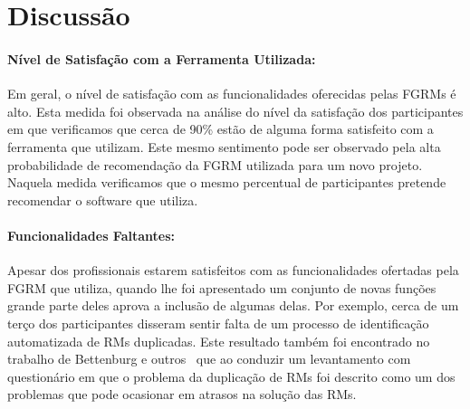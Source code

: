 \begin{table}[htpb]
\centering
{}
\caption{Classificação das funcionalidades que possam dar suporte ao uso das
metodologias dos agilistas.}
\label{tab:melhorias_fgrm_suporte_particas_ageis}
\end{table}

\section{Discussão}

\paragraph{Nível de Satisfação com a Ferramenta Utilizada:}
\label{par:pesq_profissionais_nivel_de_satisfação}

Em geral, o nível de satisfação com as funcionalidades oferecidas pelas FGRMs é
alto. Esta medida foi observada na análise do nível da satisfação dos
participantes em que verificamos que cerca de 90\% estão de alguma forma
satisfeito com a ferramenta que utilizam. Este mesmo sentimento pode ser
observado pela alta probabilidade de recomendação da FGRM utilizada para um novo
projeto. Naquela medida verificamos que o mesmo percentual de participantes
pretende recomendar o software que utiliza.

\paragraph{Funcionalidades Faltantes:}
\label{par:pesq_profissionais_funcionalidades_faltantes}

Apesar dos profissionais estarem satisfeitos com as funcionalidades ofertadas
pela FGRM que utiliza, quando lhe foi apresentado um conjunto de novas funções
grande parte deles aprova a inclusão de algumas delas. Por exemplo, cerca de um
terço dos participantes disseram sentir falta de um processo de identificação
automatizada de RMs duplicadas. Este resultado também foi encontrado no trabalho
de Bettenburg e outros~\cite{bettenburg2008makes} que ao conduzir um
levantamento com questionário em que o problema da duplicação de RMs foi descrito
como um dos problemas que pode ocasionar em atrasos na solução das RMs.

